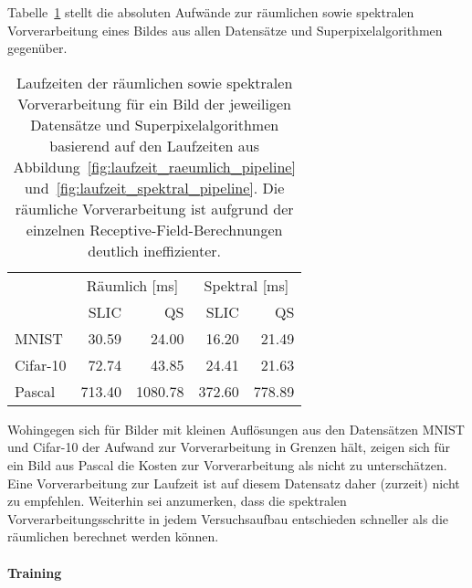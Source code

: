 Tabelle~\ref{tab:laufzeit_raeumlich_spektral} stellt die absoluten Aufwände zur räumlichen sowie spektralen Vorverarbeitung eines Bildes aus allen Datensätze und Superpixelalgorithmen gegenüber.
\begin{table}[t]
\centering
\begin{tabular}{lrrrr}
  \toprule
  & \multicolumn{2}{c}{Räumlich [ms]} & \multicolumn{2}{c}{Spektral [ms]}\\
  \cmidrule{2-5}
  & \acs{SLIC} & \acs{QS} & \acs{SLIC} & \acs{QS}\\
  \midrule
  \acs{MNIST}    & 30.59  & 24.00   & 16.20  & 21.49\\
  \acs{Cifar}-10 & 72.74  & 43.85   & 24.41  & 21.63\\
  \acs{Pascal}   & 713.40 & 1080.78 & 372.60 & 778.89\\
  \bottomrule
\end{tabular}
\caption[Laufzeiten der räumlichen und spektralen Vorverarbeitung]{Laufzeiten der räumlichen sowie spektralen Vorverarbeitung für ein Bild der jeweiligen Datensätze und Superpixelalgorithmen basierend auf den Laufzeiten aus Abbildung~\ref{fig:laufzeit_raeumlich_pipeline} und~\ref{fig:laufzeit_spektral_pipeline}.
Die räumliche Vorverarbeitung ist aufgrund der einzelnen Receptive-Field-Berechnungen deutlich ineffizienter.}
\label{tab:laufzeit_raeumlich_spektral}
\end{table}
Wohingegen sich für Bilder mit kleinen Auflösungen aus den Datensätzen \gls{MNIST} und \gls{Cifar}-10 der Aufwand zur Vorverarbeitung in Grenzen hält, zeigen sich für ein Bild aus \gls{Pascal} die Kosten zur Vorverarbeitung als nicht zu unterschätzen.
Eine Vorverarbeitung zur Laufzeit ist auf diesem Datensatz daher (zurzeit) nicht zu empfehlen.
Weiterhin sei anzumerken, dass die spektralen Vorverarbeitungsschritte in jedem Versuchsaufbau entschieden schneller als die räumlichen berechnet werden können.

\paragraph{Training}

